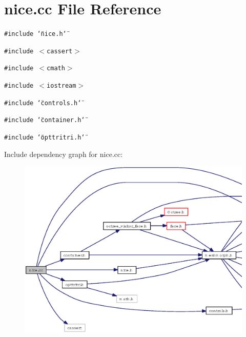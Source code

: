 \section{nice.cc File Reference}
\label{nice_8cc}
{\tt \#include \char`\"{}nice.h\char`\"{}}\par
{\tt \#include $<$cassert$>$}\par
{\tt \#include $<$cmath$>$}\par
{\tt \#include $<$iostream$>$}\par
{\tt \#include \char`\"{}controls.h\char`\"{}}\par
{\tt \#include \char`\"{}container.h\char`\"{}}\par
{\tt \#include \char`\"{}opttritri.h\char`\"{}}\par


Include dependency graph for nice.cc:\begin{figure}[H]
\begin{center}
\leavevmode
\includegraphics[width=354pt]{nice_8cc__incl}
\end{center}
\end{figure}
